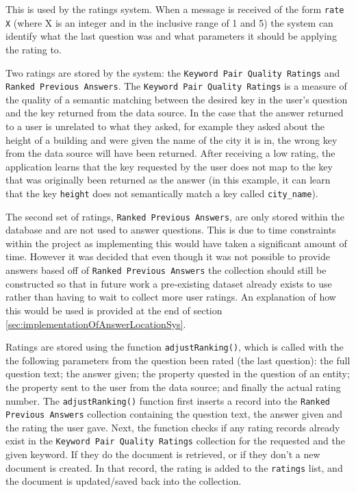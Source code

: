 \documentclass[authoryearcitations]{UoYCSproject}
\begin{document}
This is used by the ratings system. When a message is received of the form \texttt{rate X} (where X is an integer and in the inclusive range of 1 and 5) the system can identify what the last question was and what parameters it should be applying the rating to.

Two ratings are stored by the system: the \texttt{Keyword Pair Quality Ratings} and \texttt{Ranked Previous Answers}. The \texttt{Keyword Pair Quality Ratings} is a measure of the quality of a semantic matching between the desired key in the user's question and the key returned from the data source. In the case that the answer returned to a user is unrelated to what they asked, for example they asked about the height of a building and were given the name of the city it is in, the wrong key from the data source will have been returned. After receiving a low rating, the application learns that the key requested by the user does not map to the key that was originally been returned as the answer (in this example, it can learn that the key \texttt{height} does not semantically match a key called \texttt{city\_name}).

The second set of ratings, \texttt{Ranked Previous Answers}, are only stored within the database and are not used to answer questions. This is due to time constraints within the project as implementing this would have taken a significant amount of time. However it was decided that even though it was not possible to provide answers based off of \texttt{Ranked Previous Answers} the collection should still be constructed so that in future work a pre-existing dataset already exists to use rather than having to wait to collect more user ratings. An explanation of how this would be used is provided at the end of section \ref{sec:implementationOfAnswerLocationSys}.

Ratings are stored using the function \texttt{adjustRanking()}, which is called with the the following parameters from the question been rated (the last question): the full question text; the answer given; the property quested in the question of an entity; the property sent to the user from the data source; and finally the actual rating number. The \texttt{adjustRanking()} function first inserts a record into the \texttt{Ranked Previous Answers} collection containing the question text, the answer given and the rating the user gave. Next, the function checks if any rating records already exist in the \texttt{Keyword Pair Quality Ratings} collection for the requested and the given keyword. If they do the document is retrieved, or if they don't a new document is created. In that record, the rating is added to the \texttt{ratings} list, and the document is updated/saved back into the collection.
\end{document}
